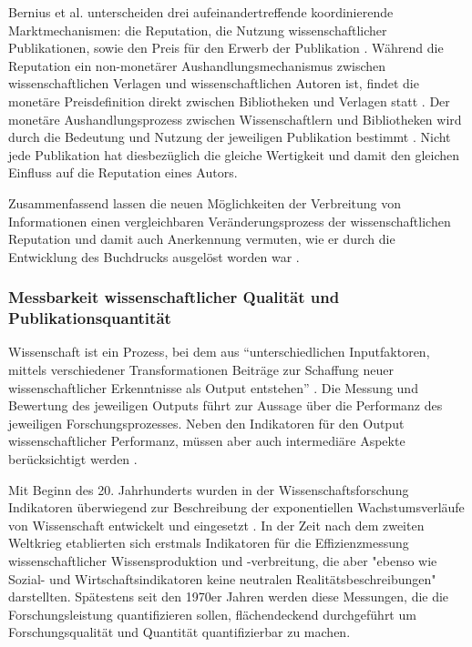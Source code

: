 Bernius et al. unterscheiden drei aufeinandertreffende koordinierende Marktmechanismen: die Reputation, die Nutzung wissenschaftlicher Publikationen, sowie den Preis für den Erwerb der Publikation \cite{cite:21a}. Während die Reputation ein non-monetärer Aushandlungsmechanismus zwischen wissenschaftlichen Verlagen und wissenschaftlichen Autoren ist, findet die monetäre Preisdefinition direkt zwischen Bibliotheken und Verlagen statt \cite{EuropeanCommission_sciencepub_2006}. Der monetäre Aushandlungsprozess zwischen Wissenschaftlern und Bibliotheken wird durch die Bedeutung und Nutzung der jeweiligen Publikation bestimmt \cite{cite:21a}. Nicht jede Publikation hat diesbezüglich die gleiche Wertigkeit \cite{suchen} und damit den gleichen Einfluss auf die Reputation eines Autors.

Zusammenfassend lassen die neuen Möglichkeiten der Verbreitung von Informationen einen vergleichbaren Veränderungsprozess der wissenschaftlichen Reputation und damit auch Anerkennung vermuten, wie er durch die Entwicklung des Buchdrucks ausgelöst worden war \cite{hanekop_2006}.

\subsubsection{Messbarkeit wissenschaftlicher Qualität und Publikationsquantität}

Wissenschaft ist ein Prozess, bei dem aus “unterschiedlichen Inputfaktoren, mittels verschiedener Transformationen Beiträge zur Schaffung neuer wissenschaftlicher Erkenntnisse als Output entstehen” \cite{Jansen_2007}. Die Messung und Bewertung des jeweiligen Outputs führt zur Aussage über die Performanz des jeweiligen Forschungsprozesses. Neben den Indikatoren für den Output wissenschaftlicher Performanz, müssen aber auch intermediäre Aspekte berücksichtigt werden \cite{schmoch_2009}.

Mit Beginn des 20. Jahrhunderts wurden in der Wissenschaftsforschung Indikatoren überwiegend zur Beschreibung der exponentiellen Wachstumsverläufe von Wissenschaft entwickelt und eingesetzt \cite{Hornbostel_1997}. In der Zeit nach dem zweiten Weltkrieg etablierten sich erstmals Indikatoren für die Effizienzmessung wissenschaftlicher Wissensproduktion und -verbreitung, die aber "ebenso wie Sozial- und Wirtschaftsindikatoren keine neutralen Realitätsbeschreibungen" \cite{Hornbostel_1997} darstellten. Spätestens seit den 1970er Jahren werden diese Messungen, die die Forschungsleistung quantifizieren sollen, flächendeckend durchgeführt \cite{Hornbostel_1997} um Forschungsqualität und Quantität quantifizierbar zu machen.

